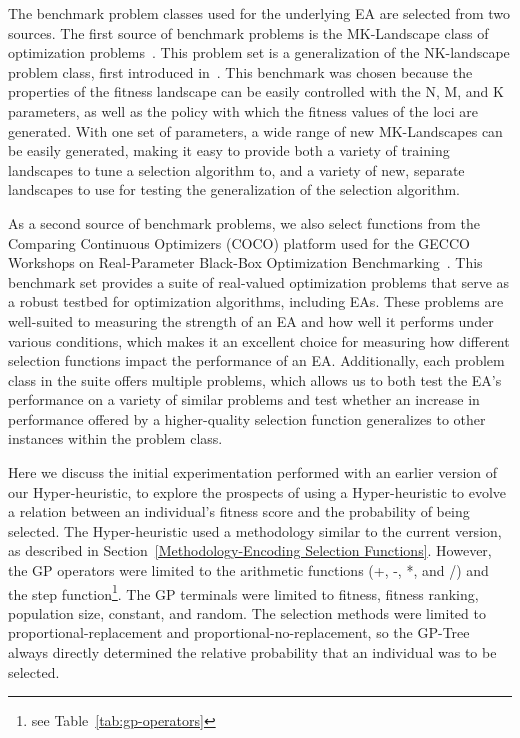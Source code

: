 \documentclass[times,12pt,titlepage]{mstogs}
\begin{document}
\begin{ThesisBody}
The benchmark problem classes used for the underlying EA are selected from two sources. The first source of benchmark problems is the MK-Landscape class of optimization problems~\citep{whitley2016gray}. This problem set is a generalization of the NK-landscape problem class, first introduced in~\citep{kaufmann1993origins}. This benchmark was chosen because the properties of the fitness landscape can be easily controlled with the N, M, and K parameters, as well as the policy with which the fitness values of the loci are generated. With one set of parameters, a wide range of new MK-Landscapes can be easily generated, making it easy to provide both a variety of training landscapes to tune a selection algorithm to, and a variety of new, separate landscapes to use for testing the generalization of the selection algorithm. 

As a second source of benchmark problems, we also select functions from the Comparing Continuous Optimizers (COCO) platform used for the GECCO Workshops on Real-Parameter Black-Box Optimization Benchmarking~\citep{cocobbob}. This benchmark set provides a suite of real-valued optimization problems that serve as a robust testbed for optimization algorithms, including EAs. These problems are well-suited to measuring the strength of an EA and how well it performs under various conditions, which makes it an excellent choice for measuring how different selection functions impact the performance of an EA. Additionally, each problem class in the suite offers multiple problems, which allows us to both test the EA's performance on a variety of similar problems and test whether an increase in performance offered by a higher-quality selection function generalizes to other instances within the problem class.

\label{Initial Experimentation}
Here we discuss the initial experimentation performed with an earlier version of our Hyper-heuristic, to explore the prospects of using a Hyper-heuristic to evolve a relation between an individual's fitness score and the probability of being selected. The Hyper-heuristic used a methodology similar to the current version, as described in Section~\ref{Methodology-Encoding Selection Functions}. However, the GP operators were limited to the arithmetic functions (+, -, *, and /) and the step function\footnote{see Table~\ref{tab:gp-operators}}. The GP terminals were limited to fitness, fitness ranking, population size, constant, and random. The selection methods were limited to proportional-replacement and proportional-no-replacement, so the GP-Tree always directly determined the relative probability that an individual was to be selected.


\end{ThesisBody}
\end{document}
